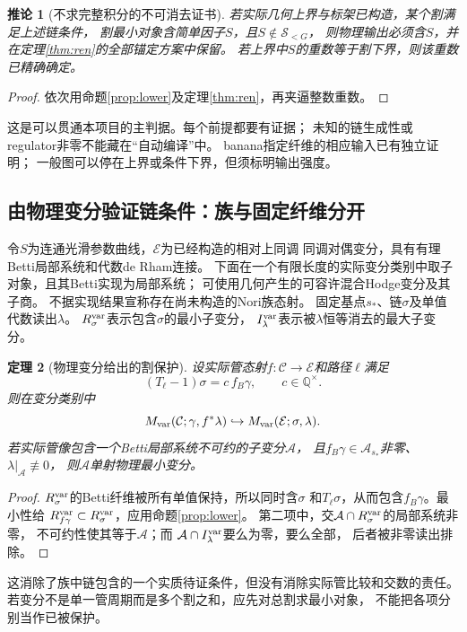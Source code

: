 \documentclass[11pt,a4paper]{ctexart}
\theoremstyle{cnplain}\newtheorem{theorem}{定理}[section]
\newtheorem{corollary}[theorem]{推论}
\theoremstyle{definition}\newtheorem{definition}[theorem]{定义}
\theoremstyle{remark}\newtheorem{remark}[theorem]{注}
\newcommand{\Q}{\mathbb Q}\newcommand{\cC}{\mathcal C}
\newcommand{\cS}{\mathcal S}\newcommand{\dR}{\mathrm{dR}}
\begin{document}
\begin{corollary}[不求完整积分的不可消去证书]\label{cor:prediction}
若实际几何上界与标架已构造，某个割满足上述链条件，
割最小对象含简单因子$S$，且$S\notin\cS_{<G}$，
则物理输出必须含$S$，并在定理\ref{thm:ren}的全部锚定方案中保留。
若上界中$S$的重数等于割下界，则该重数已精确确定。
\end{corollary}
\begin{proof}
依次用命题\ref{prop:lower}及定理\ref{thm:ren}，再夹逼整数重数。
\end{proof}
这是可以贯通本项目的主判据。每个前提都要有证据；
未知的链生成性或regulator非零不能藏在“自动编译”中。
banana指定纤维的相应输入已有独立证明；
一般图可以停在上界或条件下界，但须标明输出强度。

\subsection{由物理变分验证链条件：族与固定纤维分开}
令$S$为连通光滑参数曲线，$\mathcal E$为已经构造的相对上同调
同调对偶变分，具有有理Betti局部系统和代数de Rham连接。
下面在一个有限长度的实际变分类别中取子对象，且其Betti实现为局部系统；
可使用几何产生的可容许混合Hodge变分及其子商。
不据实现结果宣称存在尚未构造的Nori族态射。
固定基点$s_*$、链$\sigma$及单值代数读出$\lambda$。
$R_\sigma^{\rm var}$表示包含$\sigma$的最小子变分，
$I_\lambda^{\rm var}$表示被$\lambda$恒等消去的最大子变分。

\begin{theorem}[物理变分给出的割保护]\label{thm:variation}
设实际管态射$f:\mathcal C\to\mathcal E$和路径$\ell$满足
\[
 (T_\ell-1)\sigma=c\,f_B\gamma,\qquad c\in\Q^\times.
\]
则在变分类别中
\[
 M_{\rm var}(\mathcal C;\gamma,f^*\lambda)
 \hookrightarrow M_{\rm var}(\mathcal E;\sigma,\lambda).
\]
若实际管像包含一个Betti局部系统不可约的子变分$\mathcal A$，
且$f_B\gamma\in\mathcal A_{s_*}$非零、$\lambda|_{\mathcal A}\not\equiv0$，
则$\mathcal A$单射物理最小变分。
\end{theorem}
\begin{proof}
$R_\sigma^{\rm var}$的Betti纤维被所有单值保持，所以同时含$\sigma$
和$T_\ell\sigma$，从而包含$f_B\gamma$。最小性给
$R_{f\gamma}^{\rm var}\subset R_\sigma^{\rm var}$，应用命题\ref{prop:lower}。
第二项中，交$\mathcal A\cap R_\sigma^{\rm var}$的局部系统非零，
不可约性使其等于$\mathcal A$；而
$\mathcal A\cap I_\lambda^{\rm var}$要么为零，要么全部，
后者被非零读出排除。
\end{proof}
这消除了族中链包含的一个实质待证条件，但没有消除实际管比较和交数的责任。
若变分不是单一管周期而是多个割之和，应先对总割求最小对象，
不能把各项分别当作已被保护。
\end{document}
